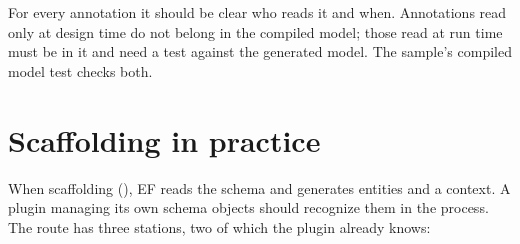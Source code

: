 \begin{tip}
  For every annotation it should be clear who reads it and when. Annotations read only at
  design time do not belong in the compiled model; those read at run time must be in it and
  need a test against the generated model. The sample's compiled model test checks both.
\end{tip}

\chapter{Scaffolding in practice}\label{ch:scaffolding-in-practice}

When scaffolding (), EF reads the schema and generates
entities and a context. A plugin managing its own schema objects should recognize them in
the process. The route has three stations, two of which the plugin already knows:

\begin{flowdiagram}
\end{flowdiagram}

